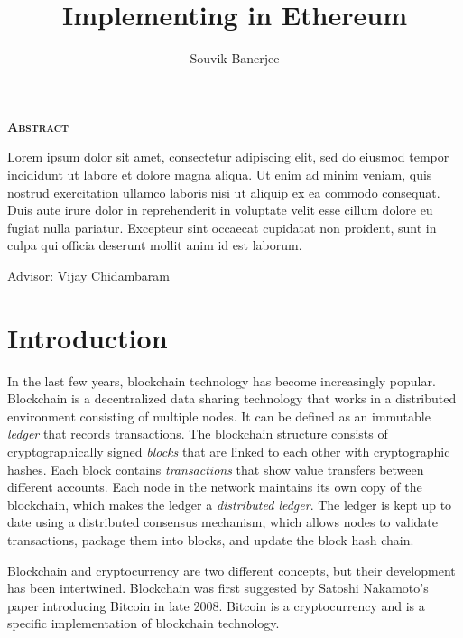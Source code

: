 \documentclass[12pt]{article}
\title{Implementing \System in Ethereum}
\author{Souvik Banerjee}
\date{}
\begin{document}
\maketitle
\thispagestyle{empty}

\begin{center}
  \textsc{\textbf{Abstract}}
\end{center}
Lorem ipsum dolor sit amet, consectetur adipiscing elit, sed do eiusmod tempor incididunt ut labore et dolore magna aliqua. Ut enim ad minim veniam, quis nostrud exercitation ullamco laboris nisi ut aliquip ex ea commodo consequat. Duis aute irure dolor in reprehenderit in voluptate velit esse cillum dolore eu fugiat nulla pariatur. Excepteur sint occaecat cupidatat non proident, sunt in culpa qui officia deserunt mollit anim id est laborum. %

\par\bigskip\noindent\vspace{3in}
\begin{center}
  Advisor: Vijay Chidambaram
\end{center}

\newpage
\thispagestyle{empty}
\tableofcontents

\newpage


\section{Introduction}


In the last few years, blockchain technology has become increasingly popular.
Blockchain is a decentralized data sharing technology that works in a distributed environment consisting of multiple nodes. It can be defined as an immutable \emph{ledger} that records transactions. The blockchain structure consists of cryptographically signed \emph{blocks} that are linked to each other with cryptographic hashes. Each block contains \emph{transactions} that show value transfers between different accounts. Each node in the network maintains its own copy of the blockchain, which makes the ledger a \emph{distributed ledger}. The ledger is kept up to date using a distributed consensus mechanism, which allows nodes to validate transactions, package them into blocks, and update the block hash chain.

Blockchain and cryptocurrency are two different concepts, but their development has been intertwined. Blockchain was first suggested by Satoshi Nakamoto's paper introducing Bitcoin in late 2008. Bitcoin is a cryptocurrency and is a specific implementation of blockchain technology.
\end{document}
